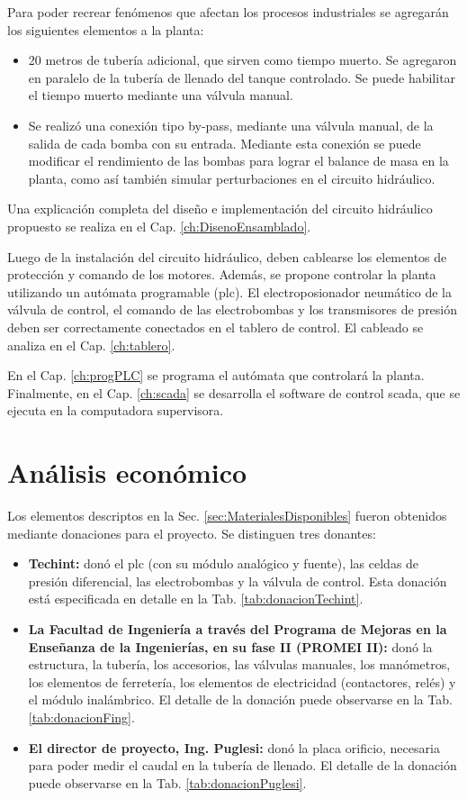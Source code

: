 Para poder recrear fenómenos que afectan los procesos industriales se agregarán
los siguientes elementos a la planta:
\begin{itemize}
\item 20 metros de tubería adicional, que sirven como tiempo
muerto.
Se agregaron en paralelo de la tubería de llenado del tanque controlado.
Se puede habilitar el tiempo muerto mediante una válvula manual.

\item Se realizó una conexión tipo by-pass, mediante una válvula manual, de
la salida de
cada bomba con su entrada. Mediante esta conexión se puede modificar el
rendimiento de las bombas para lograr el balance de masa en la planta, como así
también simular perturbaciones en el circuito hidráulico.

\end{itemize}

Una explicación completa del diseño e implementación del circuito hidráulico
propuesto se realiza en el Cap. \ref{ch:DisenoEnsamblado}.

Luego de la instalación del circuito hidráulico, deben cablearse los elementos
de protección y comando de los motores.
Además, se propone controlar la planta utilizando un autómata
programable (\gls{plc}).
El electroposionador neumático de la válvula de control, el comando de las
electrobombas y los transmisores de presión
deben ser correctamente conectados en el tablero de control.
El cableado se analiza en el Cap. \ref{ch:tablero}.

En el Cap. \ref{ch:progPLC} se programa el autómata que controlará la
planta. Finalmente, en el Cap. \ref{ch:scada} se desarrolla el software
de control \gls{scada}, que se ejecuta en la computadora supervisora.

\section{Análisis económico}
\label{sec:AnalisisEconomico}
Los elementos descriptos en la Sec. \ref{sec:MaterialesDisponibles} fueron
obtenidos mediante donaciones para el proyecto.
Se distinguen tres donantes:
\begin{itemize}
 \item \textbf{Techint:} donó el \gls{plc} (con su módulo analógico y fuente),
las celdas de presión diferencial, las electrobombas y la válvula de control.
Esta donación está especificada en detalle en la Tab.
\ref{tab:donacionTechint}.
 \item \textbf{La Facultad de Ingeniería a través del Programa de Mejoras en la
Enseñanza de la Ingenierías, en su fase II (PROMEI II):} donó la estructura,
la tubería, los
accesorios, las válvulas manuales, los manómetros, los elementos de ferretería,
los elementos de electricidad (contactores, relés) y el módulo inalámbrico.
El detalle de la donación puede observarse en la Tab. \ref{tab:donacionFing}.
\item \textbf{El director de proyecto, Ing. Puglesi:} donó la placa orificio,
necesaria para poder medir el caudal en la tubería de llenado.
El detalle de la donación puede observarse en la Tab.
\ref{tab:donacionPuglesi}.
\end{itemize}

